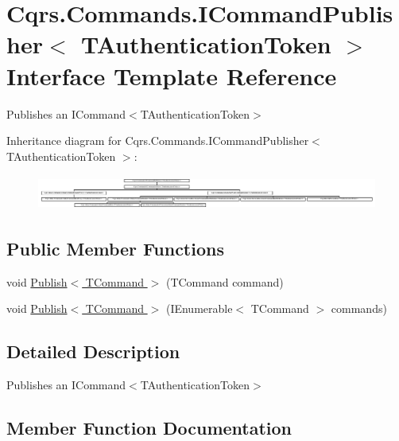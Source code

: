 \hypertarget{interfaceCqrs_1_1Commands_1_1ICommandPublisher}{}\section{Cqrs.\+Commands.\+I\+Command\+Publisher$<$ T\+Authentication\+Token $>$ Interface Template Reference}
\label{interfaceCqrs_1_1Commands_1_1ICommandPublisher}


Publishes an I\+Command$<$\+T\+Authentication\+Token$>$  


Inheritance diagram for Cqrs.\+Commands.\+I\+Command\+Publisher$<$ T\+Authentication\+Token $>$\+:\begin{figure}[H]
\begin{center}
\leavevmode
\includegraphics[height=1.159420cm]{interfaceCqrs_1_1Commands_1_1ICommandPublisher}
\end{center}
\end{figure}
\subsection*{Public Member Functions}
\begin{DoxyCompactItemize}
\item 
void \hyperlink{interfaceCqrs_1_1Commands_1_1ICommandPublisher_aeeb487ad5686d9c44d214b1daaf7833a}{Publish$<$ T\+Command $>$} (T\+Command command)
\item 
void \hyperlink{interfaceCqrs_1_1Commands_1_1ICommandPublisher_af0f033c0b949e5650032e4f00b11b595}{Publish$<$ T\+Command $>$} (I\+Enumerable$<$ T\+Command $>$ commands)
\end{DoxyCompactItemize}


\subsection{Detailed Description}
Publishes an I\+Command$<$\+T\+Authentication\+Token$>$ 



\subsection{Member Function Documentation}
\mbox{\label{interfaceCqrs_1_1Commands_1_1ICommandPublisher_aeeb487ad5686d9c44d214b1daaf7833a}} 
